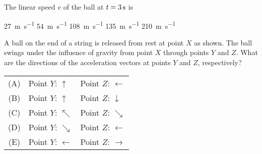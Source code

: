 \documentclass{../../oss-apphys-exam}
\begin{document}
\begin{multicols*}{2}
\begin{questions}
    \question The linear speed $v$ of the ball at $t=\SI3\second$ is
    \begin{choices}
      \choice \SI{27}{\metre\per\second}
      \choice \SI{54}{\metre\per\second}
      \choice \SI{108}{\metre\per\second}
      \choice \SI{135}{\metre\per\second}
      \choice \SI{210}{\metre\per\second}
    \end{choices}
    \label{rad2}
    
    

    \question A ball on the end of a string is released from rest at point $X$
    as shown. The ball swings under the influence of gravity from point $X$
    through points $Y$ and $Z$. What are the directions of the acceleration
    vectors at points $Y$ and $Z$, respectively?
    \begin{tabular}{cll}
      (A) & Point $Y$: {\LARGE $\uparrow$} & Point $Z$: {\LARGE $\leftarrow$}\\
      (B) & Point $Y$: {\LARGE $\uparrow$} & Point $Z$: {\LARGE $\downarrow$}\\
      (C) & Point $Y$: {\LARGE $\nwarrow$} & Point $Z$: {\LARGE $\searrow$}\\
      (D) & Point $Y$: {\LARGE $\searrow$} & Point $Z$: {\LARGE $\leftarrow$}\\
      (E) & Point $Y$: {\LARGE $\leftarrow$}&Point $Z$: {\LARGE $\rightarrow$}
    \end{tabular}


\end{questions}
\end{multicols*}
\end{document}
